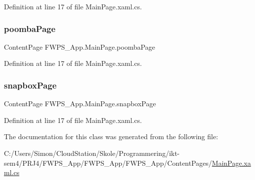 Definition at line 17 of file Main\+Page.\+xaml.\+cs.

\mbox{\label{class_f_w_p_s___app_1_1_main_page_aeda288d8d969d08c689eebe619c5aac2}} 
\subsubsection{\texorpdfstring{poomba\+Page}{poombaPage}}
{\footnotesize\ttfamily Content\+Page F\+W\+P\+S\+\_\+\+App.\+Main\+Page.\+poomba\+Page\hspace{0.3cm}{\ttfamily [private]}}



Definition at line 17 of file Main\+Page.\+xaml.\+cs.

\mbox{\label{class_f_w_p_s___app_1_1_main_page_aba8a6834b65d9019cd66830cc3c32dc6}} 
\subsubsection{\texorpdfstring{snapbox\+Page}{snapboxPage}}
{\footnotesize\ttfamily Content\+Page F\+W\+P\+S\+\_\+\+App.\+Main\+Page.\+snapbox\+Page\hspace{0.3cm}{\ttfamily [private]}}



Definition at line 17 of file Main\+Page.\+xaml.\+cs.



The documentation for this class was generated from the following file\+:\begin{DoxyCompactItemize}
\item 
C\+:/\+Users/\+Simon/\+Cloud\+Station/\+Skole/\+Programmering/ikt-\/sem4/\+P\+R\+J4/\+F\+W\+P\+S\+\_\+\+App/\+F\+W\+P\+S\+\_\+\+App/\+F\+W\+P\+S\+\_\+\+App/\+Content\+Pages/\mbox{\hyperlink{_content_pages_2_main_page_8xaml_8cs}{Main\+Page.\+xaml.\+cs}}\end{DoxyCompactItemize}
